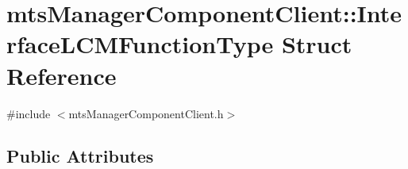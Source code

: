 \hypertarget{structmts_manager_component_client_1_1_interface_l_c_m_function_type}{}\section{mts\+Manager\+Component\+Client\+:\+:Interface\+L\+C\+M\+Function\+Type Struct Reference}
\label{structmts_manager_component_client_1_1_interface_l_c_m_function_type}


{\ttfamily \#include $<$mts\+Manager\+Component\+Client.\+h$>$}

\subsection*{Public Attributes}
